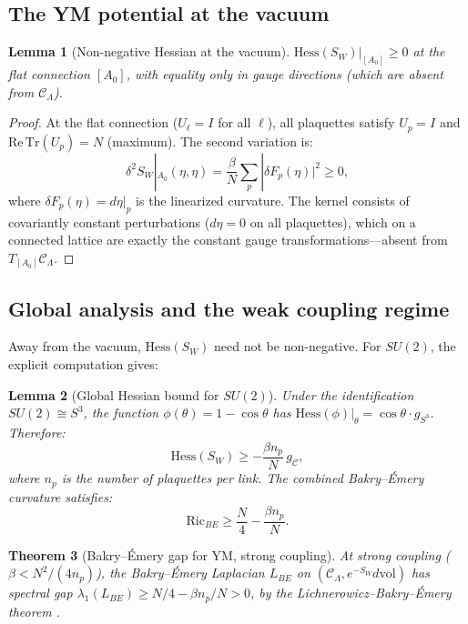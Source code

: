 \documentclass[11pt]{article}
\newtheorem{theorem}{Theorem}[section]
\newtheorem{lemma}[theorem]{Lemma}
\theoremstyle{definition}
\newcommand{\calC}{\mathcal{C}}
\newcommand{\Ric}{\mathrm{Ric}}
\newcommand{\Hess}{\mathrm{Hess}}
\newcommand{\Tr}{\mathrm{Tr}}
\begin{document}
\subsection{The YM potential at the vacuum}

\begin{lemma}[Non-negative Hessian at the vacuum]\label{lem:hessian}
$\Hess(S_W)|_{[A_0]} \geq 0$ at the flat connection $[A_0]$, with equality only in gauge directions (which are absent from $\calC_\Lambda$).
\end{lemma}

\begin{proof}
At the flat connection ($U_\ell = I$ for all $\ell$), all plaquettes satisfy $U_p = I$ and $\mathrm{Re}\,\Tr(U_p) = N$ (maximum). The second variation is:
\begin{equation}
    \delta^2 S_W|_{A_0}(\eta,\eta) = \frac{\beta}{N}\sum_p |\delta F_p(\eta)|^2 \geq 0,
\end{equation}
where $\delta F_p(\eta) = d\eta|_p$ is the linearized curvature. The kernel consists of covariantly constant perturbations ($d\eta = 0$ on all plaquettes), which on a connected lattice are exactly the constant gauge transformations---absent from $T_{[A_0]}\calC_\Lambda$.
\end{proof}

\subsection{Global analysis and the weak coupling regime}

Away from the vacuum, $\Hess(S_W)$ need not be non-negative. For $SU(2)$, the explicit computation gives:

\begin{lemma}[Global Hessian bound for $SU(2)$]\label{lem:global-hessian}
Under the identification $SU(2) \cong S^3$, the function $\phi(\theta) = 1 - \cos\theta$ has $\Hess(\phi)|_\theta = \cos\theta \cdot g_{S^3}$. Therefore:
\begin{equation}
    \Hess(S_W) \geq -\frac{\beta n_p}{N}\, g_\calC,
\end{equation}
where $n_p$ is the number of plaquettes per link. The combined Bakry--\'Emery curvature satisfies:
\begin{equation}\label{eq:ric-BE-bound}
    \Ric_{BE} \geq \frac{N}{4} - \frac{\beta n_p}{N}.
\end{equation}
\end{lemma}

\begin{theorem}[Bakry--\'Emery gap for YM, strong coupling]\label{thm:BE-gap}
At strong coupling ($\beta < N^2/(4n_p)$), the Bakry--\'Emery Laplacian $L_{BE}$ on $(\calC_\Lambda, e^{-S_W} d\mathrm{vol})$ has spectral gap $\lambda_1(L_{BE}) \geq N/4 - \beta n_p / N > 0$, by the Lichnerowicz--Bakry--\'Emery theorem \cite{BakryEmery85, Lichnerowicz58}.
\end{theorem}
\end{document}
